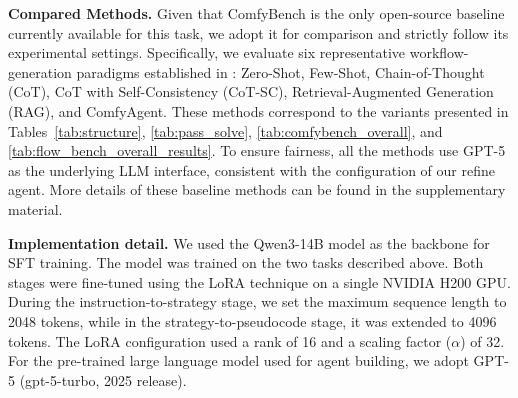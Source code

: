 \documentclass[runningheads]{llncs}
\begin{document}
\noindent\textbf{Compared Methods.} 
Given that ComfyBench \cite{xue2025comfybench} is the only open-source baseline currently available for this task, we adopt it for comparison and strictly follow its experimental settings. Specifically, we evaluate six representative workflow-generation paradigms established in \cite{xue2025comfybench}: Zero-Shot, Few-Shot, Chain-of-Thought (CoT), CoT with Self-Consistency (CoT-SC), Retrieval-Augmented Generation (RAG), and ComfyAgent. These methods correspond to the variants presented in Tables~\ref{tab:structure}, \ref{tab:pass_solve}, \ref{tab:comfybench_overall}, and \ref{tab:flow_bench_overall_results}.
To ensure fairness, all the methods use GPT-5 as the underlying LLM interface, consistent with the configuration of our refine agent. 
More details of these baseline methods can be found in the supplementary material.




\noindent\textbf{Implementation detail.}
%
We used the Qwen3-14B model as the backbone for SFT training. The model was trained on the two tasks described above.
%
Both stages were fine-tuned using the LoRA technique on a single NVIDIA H200 GPU.
%
During the instruction-to-strategy stage, we set the maximum sequence length to 2048 tokens, while in the strategy-to-pseudocode stage, it was extended to 4096 tokens.
%
The LoRA configuration used a rank of 16 and a scaling factor ($\alpha$) of 32.
%
For the pre-trained large language model used for agent building, we adopt GPT-5 (gpt-5-turbo, 2025 release).




\end{document}
